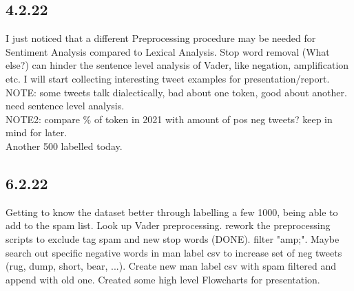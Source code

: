 \subsection{4.2.22}
I just noticed that a different Preprocessing procedure may be needed for Sentiment Analysis compared to Lexical Analysis. Stop word removal (What else?) can hinder the sentence level analysis of Vader, like negation, amplification etc.
I will start collecting interesting tweet examples for presentation/report. \\
NOTE: some tweets talk dialectically, bad about one token, good about another. need sentence level analysis.\\
NOTE2: compare \% of token in 2021 with amount of pos neg tweets? keep in mind for later. \\
Another 500 labelled today.

\subsection{6.2.22}
Getting to know the dataset better through labelling a few 1000, being able to add to the spam list. Look up Vader preprocessing. rework the preprocessing scripts to exclude tag spam and new stop words (DONE). filter "amp;".
Maybe search out specific negative words in man label csv to increase set of neg tweets (rug, dump, short, bear, ...).
Create new man label csv with spam filtered and append with old one. 
Created some high level Flowcharts for presentation.

